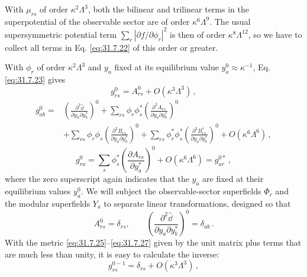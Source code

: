 With \(\mu_{rs}\) of order \(\kappa^2\Lambda^3\), both the bilinear and
trilinear terms in the superpotential of the observable sector are of order
\(\kappa^6\Lambda^9\). The usual supersymmetric potential term
\(\sum_r|\partial f/\partial\phi_r|^2\) is then of order
\(\kappa^8\Lambda^{12}\), so we have to collect all terms in
Eq. \eqref{eq:31.7.22} of this order or greater.

With \(\phi_r\) of order \(\kappa^2\Lambda^3\) and \(y_a\) fixed at its
equilibrium value \(y_a^0\approx\kappa^{-1}\), Eq. \eqref{eq:31.7.23}
gives
\begin{equation}
  g_{rs}^0=A_{rs}^0+O(\kappa^3\Lambda^3)\,,
  \tag{31.7.25}\label{eq:31.7.25}
\end{equation}
\begin{equation}
  \begin{aligned}
  g_{ab}^0={}&
  \left(\frac{\partial^2\widehat \dd}
    {\partial y_a\partial y_b^*}\right)^0
  +\sum_{rs}\phi_r\phi_s^*
    \left(\frac{\partial^2A_{rs}}
      {\partial y_a\partial y_b^*}\right)^0
  \\
  &+\sum_{rs}\phi_r\phi_s
    \left(\frac{\partial^2B_{rs}}
      {\partial y_a\partial y_b^*}\right)^0
  +\sum_{rs}\phi_r^*\phi_s^*
    \left(\frac{\partial^2B_{rs}^*}
      {\partial y_a\partial y_b^*}\right)^0
  +O(\kappa^6\Lambda^6)\,,
  \end{aligned}
  \tag{31.7.26}\label{eq:31.7.26}
\end{equation}
\begin{equation}
  g_{ra}^0
  =\sum_s\phi_s^*
    \left(\frac{\partial A_{rs}}{\partial y_a^*}\right)^0
   +O(\kappa^6\Lambda^6)
  =g_{ar}^{0*}\,,
  \tag{31.7.27}\label{eq:31.7.27}
\end{equation}
where the zero superscript again indicates that the \(y_a\) are fixed at
their equilibrium values \(y_a^0\). We will subject the observable-sector
superfields \(\Phi_r\) and the modular superfields \(Y_a\) to separate
linear transformations, designed so that
\begin{equation}
  A_{rs}^0=\delta_{rs},\qquad
  \left(\frac{\partial^2\widehat \dd}
    {\partial y_a\partial y_b^*}\right)^0
  =\delta_{ab}\,.
  \tag{31.7.28}\label{eq:31.7.28}
\end{equation}
With the metric \eqref{eq:31.7.25}--\eqref{eq:31.7.27} given by the unit
matrix plus terms that are much less than unity, it is easy to calculate
the inverse:
\begin{equation}
  g_{rs}^{0-1}=\delta_{rs}+O(\kappa^3\Lambda^3)\,,
  \tag{31.7.29}\label{eq:31.7.29}
\end{equation}
